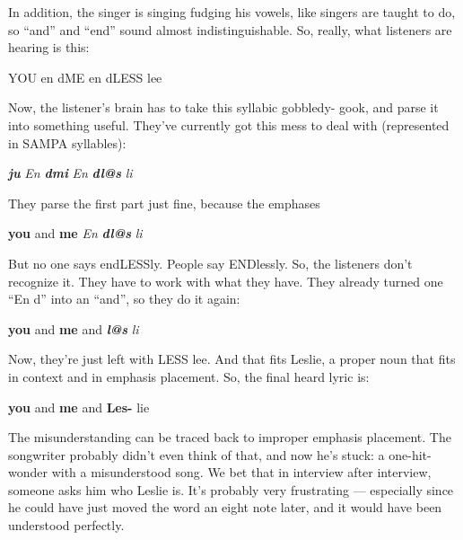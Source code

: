 \documentclass{article}
\begin{document}
{\large In addition, the singer is singing fudging his vowels, like singers are 
taught to do, so ``and'' and ``end'' sound almost indistinguishable. So, really, 
what listeners are hearing is this:}

\begin{center}
{\large YOU en dME en dLESS lee}
\end{center}

\vspace{12pt}
{\large Now, the listener's brain has to take this syllabic gobbledy- gook, and 
parse it into something useful. They've currently got this mess to deal with (represented 
in SAMPA syllables):}

\begin{center}
{\large \textit{\textbf{ju }}}{\large \textit{En }}{\large \textit{\textbf{dmi 
}}}{\large \textit{En }}{\large \textit{\textbf{dl@s }}}{\large \textit{li}}
\end{center}

\vspace{12pt}
{\large They parse the first part just fine, because the emphases}

\begin{center}
{\large \textbf{you }}{\large and }{\large \textbf{me }}{\large \textit{En }}{\large \textit{\textbf{dl@s 
}}}{\large \textit{li}}
\end{center}

{\large But no one says endLESSly. People say ENDlessly. So, the listeners don't 
recognize it. They have to work with what they have. They already turned one ``En 
d'' into an ``and'', so they do it again:}

\begin{center}
{\large \textbf{you }}{\large and }{\large \textbf{me }}{\large and }{\large \textit{\textbf{l@s 
}}}{\large \textit{li}}
\end{center}

{\large Now, they're just left with LESS lee. And that fits Leslie, a proper noun 
that fits in context and in emphasis placement. So, the final heard lyric is:}

\begin{center}
{\large \textbf{you }}{\large and }{\large \textbf{me }}{\large and }{\large \textbf{Les- 
}}{\large lie}
\end{center}

{\large The misunderstanding can be traced back to improper emphasis placement. 
The songwriter probably didn't even think of that, and now he's stuck: a one-hit-wonder 
with a misunderstood song. We bet that in interview after interview, someone asks 
him who Leslie is. It's probably very frustrating --- especially since he could 
have just moved the word an eight note later, and it would have been understood 
perfectly.}
\end{document}
